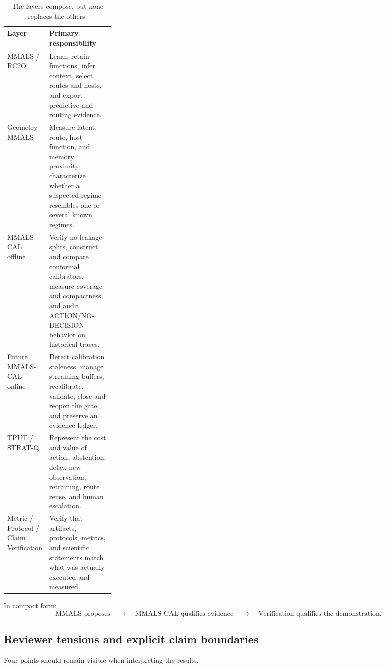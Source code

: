 \begin{table}[H]
\centering\small
\begin{tabularx}{\linewidth}{p{0.25\linewidth} X}
\toprule
Layer & Primary responsibility\\
\midrule
MMALS / RC2O & Learn, retain functions, infer context, select routes and hosts, and export predictive and routing evidence.\\
Geometry-MMALS & Measure latent, route, host-function, and memory proximity; characterize whether a suspected regime resembles one or several known regimes.\\
MMALS-CAL offline & Verify no-leakage splits, construct and compare conformal calibrators, measure coverage and compactness, and audit ACTION/NO-DECISION behavior on historical traces.\\
Future MMALS-CAL online & Detect calibration staleness, manage streaming buffers, recalibrate, validate, close and reopen the gate, and preserve an evidence ledger.\\
TPUT / STRAT-Q & Represent the cost and value of action, abstention, delay, new observation, retraining, route reuse, and human escalation.\\
Metric / Protocol / Claim Verification & Verify that artifacts, protocols, metrics, and scientific statements match what was actually executed and measured.\\
\bottomrule
\end{tabularx}
\caption{The layers compose, but none replaces the others.}
\end{table}

In compact form:
\begin{equation}
\text{MMALS proposes}\quad\rightarrow\quad\text{MMALS-CAL qualifies evidence}\quad\rightarrow\quad\text{Verification qualifies the demonstration}.
\end{equation}

\subsection{Reviewer tensions and explicit claim boundaries}

Four points should remain visible when interpreting the results.


